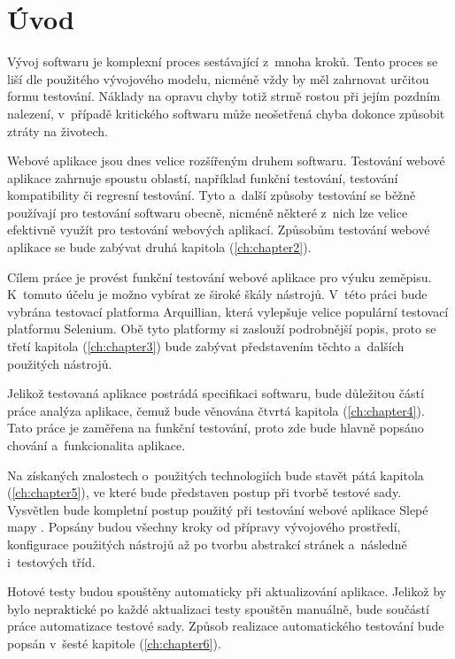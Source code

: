 \documentclass[
    color,   %
	table,   %
    twoside, %
    nolot, nolof,
]{fithesis3}
\begin{document}
\raggedbottom

\chapter{Úvod}
\label{ch:chapter1}
Vývoj softwaru je komplexní proces sestávající z~mnoha kroků. Tento proces se liší dle použitého vývojového modelu, nicméně vždy by měl zahrnovat určitou formu testování. Náklady na opravu chyby totiž strmě rostou při jejím pozdním nalezení, v~případě kritického softwaru může neošetřená chyba dokonce způsobit ztráty na životech.

Webové aplikace jsou dnes velice rozšířeným druhem softwaru. Testování webové aplikace zahrnuje spoustu oblastí, například funkční testování, testování kompatibility či regresní testování. Tyto a~další způsoby testování se běžně používají pro testování softwaru obecně, nicméně některé z~nich lze velice efektivně využít pro testování webových aplikací. Způsobům testování webové aplikace se bude zabývat druhá kapitola (\ref{ch:chapter2}).

Cílem práce je provést funkční testování webové aplikace pro výuku zeměpisu. K~tomuto účelu je možno vybírat ze široké škály nástrojů. V~této práci bude vybrána testovací platforma Arquillian, která vylepšuje velice populární testovací platformu Selenium. Obě tyto platformy si zaslouží podrobnější popis, proto se třetí kapitola (\ref{ch:chapter3}) bude zabývat představením těchto a~dalších použitých nástrojů.

Jelikož testovaná aplikace postrádá specifikaci softwaru, bude důležitou částí práce analýza aplikace, čemuž bude věnována čtvrtá kapitola (\ref{ch:chapter4}). Tato práce je zaměřena na funkční testování, proto zde bude hlavně popsáno chování a~funkcionalita aplikace. 

Na získaných znalostech o~použitých technologiích bude stavět pátá kapitola (\ref{ch:chapter5}), ve které bude představen postup při tvorbě testové sady. Vysvětlen bude kompletní postup použitý při testování webové aplikace Slepé mapy \cite{SlepeMapy}. Popsány budou všechny kroky od přípravy vývojového prostředí, konfigurace použitých nástrojů až po tvorbu abstrakcí stránek a~následně i~testových tříd.

Hotové testy budou spouštěny automaticky při aktualizování aplikace. Jelikož by bylo  nepraktické po každé aktualizaci testy spouštěn manuálně, bude součástí práce automatizace testové sady. Způsob realizace automatického testování bude popsán v~šesté kapitole (\ref{ch:chapter6}).
\end{document}
